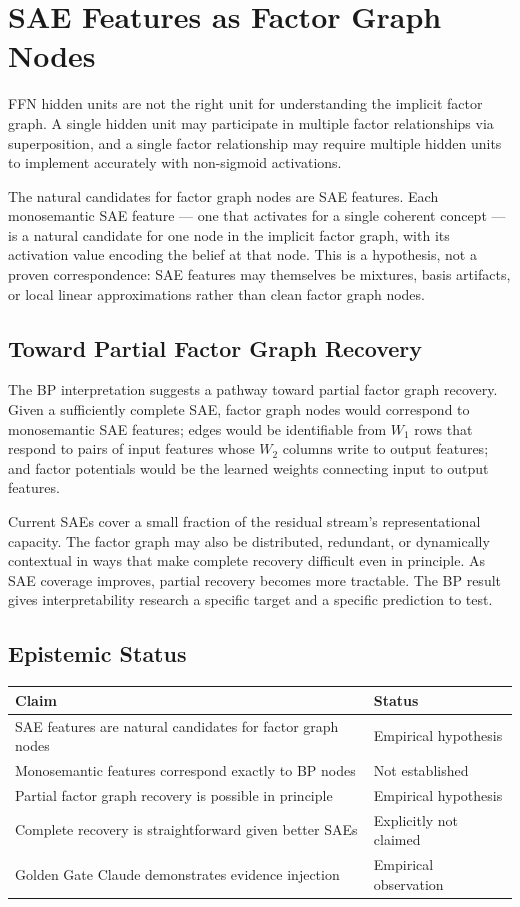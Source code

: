 \section{SAE Features as Factor Graph Nodes}
\label{sec:sae-features}

FFN hidden units are not the right unit for understanding the implicit
factor graph. A single hidden unit may participate in multiple factor
relationships via superposition, and a single factor relationship may
require multiple hidden units to implement accurately with non-sigmoid
activations.

The natural candidates for factor graph nodes are SAE features.
Each monosemantic SAE feature --- one that activates for a single coherent
concept --- is a natural candidate for one node in the implicit factor
graph, with its activation value encoding the belief at that node. This
is a hypothesis, not a proven correspondence: SAE features may themselves
be mixtures, basis artifacts, or local linear approximations rather than
clean factor graph nodes.

\subsection*{Toward Partial Factor Graph Recovery}

The BP interpretation suggests a pathway toward partial factor graph
recovery. Given a sufficiently complete SAE, factor graph nodes would
correspond to monosemantic SAE features; edges would be identifiable from
$W_1$ rows that respond to pairs of input features whose $W_2$ columns
write to output features; and factor potentials would be the learned
weights connecting input to output features.

Current SAEs cover a small fraction of the residual stream's
representational capacity. The factor graph may also be distributed,
redundant, or dynamically contextual in ways that make complete recovery
difficult even in principle. As SAE coverage improves, partial recovery
becomes more tractable. The BP result gives interpretability research a
specific target and a specific prediction to test.

\subsection*{Epistemic Status}

\begin{center}
\begin{tabular}{ll}
\toprule
Claim & Status \\
\midrule
SAE features are natural candidates for factor graph nodes & Empirical hypothesis \\
Monosemantic features correspond exactly to BP nodes & Not established \\
Partial factor graph recovery is possible in principle & Empirical hypothesis \\
Complete recovery is straightforward given better SAEs & Explicitly not claimed \\
Golden Gate Claude demonstrates evidence injection & Empirical observation \\
\bottomrule
\end{tabular}
\end{center}